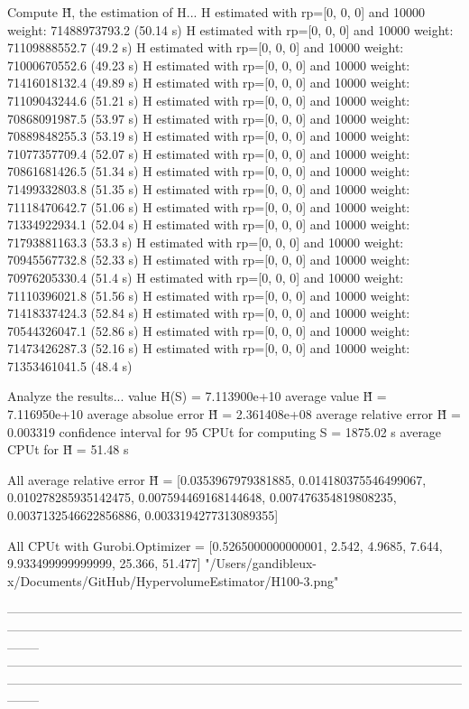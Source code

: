Compute H̃, the estimation of H...
  H estimated with rp=[0, 0, 0] and 10000 weight:  71488973793.2  (50.14 s)
  H estimated with rp=[0, 0, 0] and 10000 weight:  71109888552.7  (49.2 s)
  H estimated with rp=[0, 0, 0] and 10000 weight:  71000670552.6  (49.23 s)
  H estimated with rp=[0, 0, 0] and 10000 weight:  71416018132.4  (49.89 s)
  H estimated with rp=[0, 0, 0] and 10000 weight:  71109043244.6  (51.21 s)
  H estimated with rp=[0, 0, 0] and 10000 weight:  70868091987.5  (53.97 s)
  H estimated with rp=[0, 0, 0] and 10000 weight:  70889848255.3  (53.19 s)
  H estimated with rp=[0, 0, 0] and 10000 weight:  71077357709.4  (52.07 s)
  H estimated with rp=[0, 0, 0] and 10000 weight:  70861681426.5  (51.34 s)
  H estimated with rp=[0, 0, 0] and 10000 weight:  71499332803.8  (51.35 s)
  H estimated with rp=[0, 0, 0] and 10000 weight:  71118470642.7  (51.06 s)
  H estimated with rp=[0, 0, 0] and 10000 weight:  71334922934.1  (52.04 s)
  H estimated with rp=[0, 0, 0] and 10000 weight:  71793881163.3  (53.3 s)
  H estimated with rp=[0, 0, 0] and 10000 weight:  70945567732.8  (52.33 s)
  H estimated with rp=[0, 0, 0] and 10000 weight:  70976205330.4  (51.4 s)
  H estimated with rp=[0, 0, 0] and 10000 weight:  71110396021.8  (51.56 s)
  H estimated with rp=[0, 0, 0] and 10000 weight:  71418337424.3  (52.84 s)
  H estimated with rp=[0, 0, 0] and 10000 weight:  70544326047.1  (52.86 s)
  H estimated with rp=[0, 0, 0] and 10000 weight:  71473426287.3  (52.16 s)
  H estimated with rp=[0, 0, 0] and 10000 weight:  71353461041.5  (48.4 s)

Analyze the results...
  value H(S)                  = 7.113900e+10 
  average value H̃             = 7.116950e+10 
  average absolue error H̃     = 2.361408e+08 
  average relative error H̃    = 0.003319 
  confidence interval for 95%
  CPUt for computing S         = 1875.02 s
  average CPUt for H̃           = 51.48 s

All average relative error H̃ = [0.0353967979381885, 0.014180375546499067, 0.010278285935142475, 0.007594469168144648, 0.007476354819808235, 0.0037132546622856886, 0.0033194277313089355]

All CPUt with Gurobi.Optimizer = [0.5265000000000001, 2.542, 4.9685, 7.644, 9.933499999999999, 25.366, 51.477]
"/Users/gandibleux-x/Documents/GitHub/HypervolumeEstimator/H100-3.png"

--------------------------------------------------------------------------------------------------------------------------------------------------------------------------------------------------------------------------------
--------------------------------------------------------------------------------------------------------------------------------------------------------------------------------------------------------------------------------

